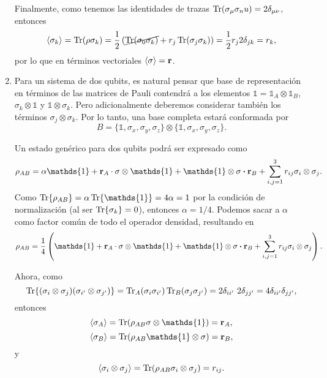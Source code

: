 \documentclass{scrartcl}
\newcommand{\inv}[1]{\frac{1}{#1}}
\DeclareRobustCommand{\[}{\begin{equation}}
\DeclareRobustCommand{\]}{\end{equation}}
\begin{document}
\begin{enumerate}
    Finalmente, como tenemos las identidades de trazas $\Tr(\sigma_\mu \sigma_nu) = 2 \delta_{\mu\nu}$, entonces
    \[ \expval{\sigma_k} = \Tr(\rho \sigma_k) = \inv{2} \left( \cancel{\Tr(\sigma_0 \sigma_k)} + r_j \Tr(\sigma_j \sigma_k) \right) = \inv{2} r_j 2 \delta_{jk} = r_k, \]
    por lo que en términos vectoriales $\expval{\vb{\sigma}} = \vb{r}$.
    
    
    
    
    \item Para un sistema de dos qubits, es natural pensar que base de representación en términos de las matrices de Pauli contendrá a los elementos $\mathds{1} = \mathds{1}_A \otimes \mathds{1}_B$, $\sigma_k \otimes \mathds{1}$ y $\mathds{1} \otimes \sigma_k$. Pero adicionalmente deberemos considerar también los términos $\sigma_j \otimes \sigma_k$. Por lo tanto, una base completa estará conformada por
    \[ B = \{ \mathds{1}, \sigma_x, \sigma_y, \sigma_z \} \otimes \{ \mathds{1}, \sigma_x, \sigma_y, \sigma_z \}. \]
    
    Un estado genérico para dos qubits podrá ser expresado como
    \[ \rho_{AB} = \alpha \mathds{1} + \vb{r}_A \cdot \vb{\sigma} \otimes \mathds{1} + \mathds{1} \otimes \vb{\sigma} \vdot \vb{r}_B + \sum_{i,j = 1}^3 r_{ij} \sigma_i \otimes \sigma_j. \]
    Como $\Tr{\rho_{AB}} = \alpha \Tr{\mathds{1}} = 4 \alpha = 1$ por la condición de normalización (al ser $\Tr{\sigma_k} = 0$), entonces $\alpha = 1/4$. Podemos sacar a $\alpha$ como factor común de todo el operador densidad, resultando en
    \[ \rho_{AB} = \inv{4} \left(\mathds{1} + \vb{r}_A \cdot \vb{\sigma} \otimes \mathds{1} + \mathds{1} \otimes \vb{\sigma} \vdot \vb{r}_B + \sum_{i,j = 1}^3 r_{ij} \sigma_i \otimes \sigma_j \right). \]
    
    Ahora, como
    \[ \Tr{(\sigma_i \otimes \sigma_j)(\sigma_{i'} \otimes \sigma_{j'})} = \Tr_A (\sigma_i \sigma_{i'}) \Tr_B (\sigma_j \sigma_{j'}) = 2 \delta_{i i'} \ 2 \delta_{j j'} = 4 \delta_{i i'} \delta_{j j'}, \]
    entonces
    \[ \expval{\vb{\sigma}_A} = \Tr(\rho_{AB} \vb{\sigma} \otimes \mathds{1}) = \vb{r}_A, \]
    \[ \expval{\vb{\sigma}_B} = \Tr(\rho_{AB} \mathds{1} \otimes \vb{\sigma}) = \vb{r}_B, \]
    y
    \[ \expval{\sigma_i \otimes \sigma_j} = \Tr(\rho_{AB} \sigma_i \otimes \sigma_j) = r_{ij}. \]
    

\end{enumerate}
\end{document}
